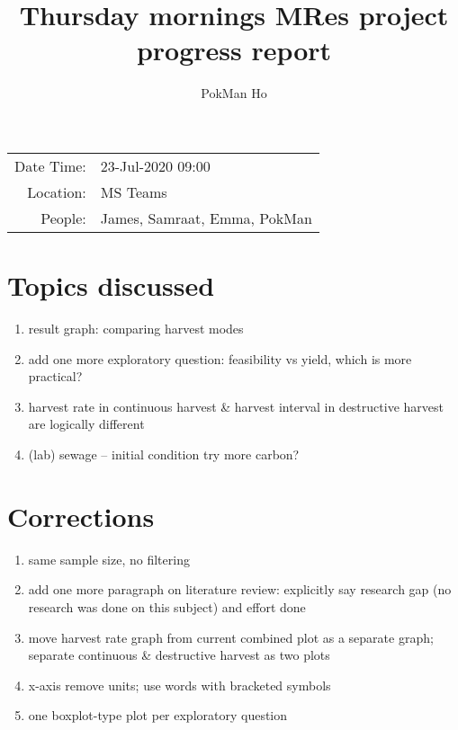 \documentclass[a4paper,11pt]{article}
\title{Thursday mornings MRes project progress report}
\author{PokMan Ho}
\date{}
\begin{document}
    \maketitle
    
    \begin{tabular}{rl}
        Date Time: & 23-Jul-2020 09:00 \\
        Location: & MS Teams \\
        People: & James, Samraat, Emma, PokMan \\
    \end{tabular}
    
    \section{Topics discussed}
    \begin{enumerate}
        \item result graph: comparing harvest modes
        \item add one more exploratory question: feasibility vs yield, which is more practical?
        \item harvest rate in continuous harvest \& harvest interval in destructive harvest are logically different
        \item (lab) sewage -- initial condition try more carbon?
    \end{enumerate}
    
    \section{Corrections}
    \begin{enumerate}
        \item same sample size, no filtering
        \item add one more paragraph on literature review: explicitly say research gap (no research was done on this subject) and effort done
        \item move harvest rate graph from current combined plot as a separate graph; separate continuous \& destructive harvest as two plots
        \item x-axis remove units; use words with bracketed symbols
        \item one boxplot-type plot per exploratory question
    \end{enumerate}
    
\end{document}

